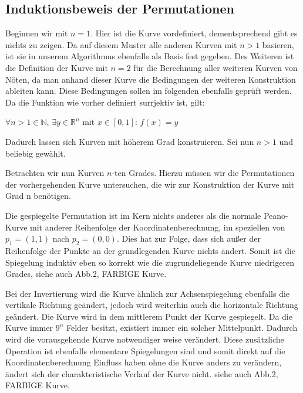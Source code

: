 \documentclass[course=asp]{aspdoc}
\begin{document}
\subsection{Induktionsbeweis der Permutationen}
Beginnen wir mit $n = 1$. Hier ist die Kurve vordefiniert, dementsprechend gibt es nichts zu zeigen. Da auf diesem Muster alle anderen Kurven mit $n > 1$ basieren, ist sie in unserem Algorithmus ebenfalls als Basis fest gegeben.
Des Weiteren ist die Definition der Kurve mit $n = 2$ für die Berechnung aller weiteren Kurven von Nöten, da man anhand dieser Kurve die Bedingungen der weiteren Konstruktion ableiten kann. Diese Bedingungen sollen im folgenden ebenfalls geprüft werden.
Da die Funktion wie vorher definiert surrjektiv ist, gilt:

\begin{center}
$\forall n > 1 \in \mathbb{N}$, $\exists y \in \mathbb{R}^n$ mit $x \in [0,1]$: $f(x)= y$	%
\end{center}


Dadurch lassen sich Kurven mit höherem Grad konstruieren. Sei nun $n > 1$ und beliebig gewählt.

Betrachten wir nun Kurven $n$-ten Grades. Hierzu müssen wir die Permutationen der vorhergehenden Kurve untersuchen, die wir zur Konstruktion der Kurve mit Grad n benötigen.	

Die gespiegelte Permutation ist im Kern nichts anderes als die normale Peano-Kurve mit anderer Reihenfolge der Koordinatenberechnung, im speziellen von $p_1=(1,1)$ nach $p_2 = (0,0)$. Dies hat zur Folge, dass sich außer der Reihenfolge der Punkte an der grundlegenden Kurve nichts ändert. Somit ist die Spiegelung induktiv eben so korrekt wie die zugrundeliegende Kurve niedrigeren Grades, siehe auch Abb.2, FARBIGE Kurve.

Bei der Invertierung wird die Kurve ähnlich zur Achsenspiegelung ebenfalls die vertikale Richtung geändert, jedoch wird weiterhin auch die horizontale Richtung geändert. Die Kurve wird in dem mittlerem Punkt der Kurve gespiegelt. Da die Kurve immer $9^n$ Felder besitzt, existiert immer ein solcher Mittelpunkt. Dadurch wird die vorausgehende Kurve notwendiger weise verändert.  Diese zusätzliche Operation ist ebenfalls elementare Spiegelungen sind und somit direkt auf die Koordinatenberechnung Einfluss haben ohne die Kurve anders zu verändern, ändert sich der charakteristische Verlauf der Kurve nicht. siehe auch Abb.2, FARBIGE Kurve.
\end{document}
